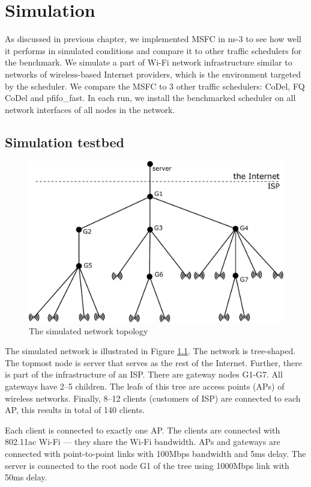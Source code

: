\chapter{Simulation}

\label{chap3}
As discussed in previous chapter, we implemented MSFC in ns-3 to see how well it performs in simulated conditions and compare it to other traffic schedulers for the benchmark. We simulate a part of Wi-Fi network infrastructure similar to networks of wireless-based Internet providers, which is the environment targeted by the scheduler. We compare the MSFC to 3 other traffic schedulers: CoDel, FQ CoDel and pfifo\_fast. In each run, we install the benchmarked scheduler on all network interfaces of all nodes in the network.

\section{Simulation testbed}
\label{testbed}
\begin{figure}
	\centering
	\includegraphics[width=137mm]{drawings/layout}
	\caption{The simulated network topology}
	\label{fig11:sim_layout}
\end{figure}


The simulated network is illustrated in Figure \ref{fig11:sim_layout}. The network is tree-shaped. The topmost node is server that serves as the rest of the Internet. Further, there is part of the infrastructure of an ISP. There are gateway nodes G1-G7. All gateways have 2--5 children. The leafs of this tree are access points (APs) of wireless networks. Finally, 8--12 clients (customers of ISP) are connected to each AP, this results in total of 140 clients.

Each client is connected to exactly one AP. The clients are connected with 802.11ac Wi-Fi --- they share the Wi-Fi bandwidth. APs and gateways are connected with point-to-point links with 100Mbps bandwidth and 5ms delay. The server is connected to the root node G1 of the tree using 1000Mbps link with 50ms delay.


